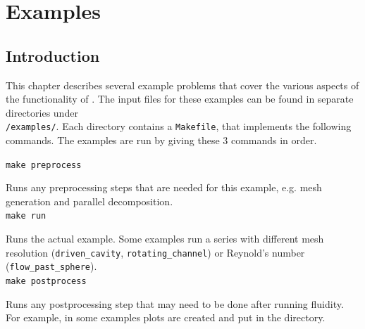 \chapter{Examples}
\label{chap:examples}
\section{Introduction}
\label{sec:examples_introduction}
This chapter describes several example problems that cover the various aspects of the functionality
of \fluidity. The input files for these examples can be found in separate directories
under \\ \texttt{\fluiditysourcepath/examples/}. Each directory contains a \texttt{Makefile},
that implements the following commands. The examples are run by giving these 3 commands in order.

\hspace{0.05\textwidth}
\begin{minipage}{0.9\textwidth}
\texttt{make preprocess}

Runs any preprocessing steps that are needed for this example, e.g. mesh generation and
parallel decomposition.
\ \\

\texttt{make run}

Runs the actual example. Some examples run a series with different mesh resolution
(\texttt{driven\_cavity}, \texttt{rotating\_channel}) or Reynold's number
(\texttt{flow\_past\_sphere}).
\ \\

\texttt{make postprocess}

Runs any postprocessing step that may need to be done after running fluidity. For example, in some
examples plots are created and put in the directory.
\end{minipage}

